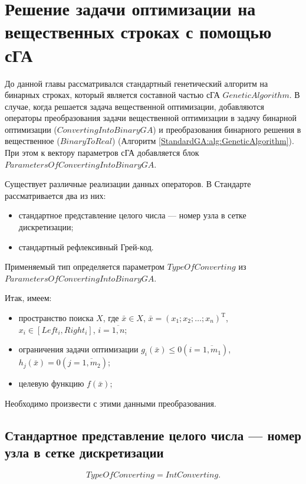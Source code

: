 \chapter{Решение задачи оптимизации на вещественных строках с помощью сГА}\label{StandardGA:section_realga}

До данной главы рассматривался стандартный генетический алгоритм на бинарных строках, который является составной частью сГА $ GeneticAlgorithm $. В случае, когда решается задача вещественной оптимизации, добавляются операторы преобразования задачи вещественной оптимизации в задачу бинарной оптимизации ($ ConvertingIntoBinaryGA $) и преобразования бинарного решения в вещественное ($ BinaryToReal $) (Алгоритм \ref{StandardGA:alg:GeneticAlgorithm}). При этом к вектору параметров сГА добавляется блок $ ParametersOfConvertingIntoBinaryGA $.

Существует различные реализации данных операторов. В Стандарте рассматривается два из них:
\begin{itemize}
\item стандартное представление целого числа --- номер узла в сетке дискретизации;
\item стандартный рефлексивный Грей-код.
\end{itemize}

Применяемый тип определяется параметром $ TypeOfConverting $ из $ ParametersOfConvertingIntoBinaryGA $.

Итак,  имеем:
\begin{itemize}
\item пространство поиска $ X $, где $ \bar{x} \in X $, $ \bar{x}={\left( x_1;x_2;\ldots;x_n\right)}^\mathrm{T}  $, $ x_i \in \left[  Left_i, Right_i\right] $, $ i=\overline{1,n} $;
\item ограничения задачи оптимизации $ g_i\left(\bar{x} \right)\leq 0 \left( i=\overline{1,m_1}\right) $, $ h_j\left(\bar{x} \right)= 0 \left( j=\overline{1,m_2}\right) $;
\item целевую функцию $ f\left( \bar{x}\right)  $;
\end{itemize}

Необходимо произвести с этими данными преобразования.

\section{Стандартное представление целого числа --- номер узла в сетке дискретизации} \label{StandardGA:subsection_IntConverting}
\begin{equation}
\label{StandardGA:eq:IntConverting}
TypeOfConverting =IntConverting.
\end{equation}

